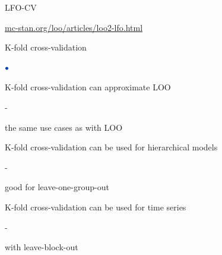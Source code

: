 \documentclass[english,t]{beamer}
\newenvironment{list1}{
   \begin{list}{$\color{list1}\bullet$}{\itemsep=6pt}}{
  \end{list}}
\newenvironment{list2}{
  \begin{list}{-}{\baselineskip=12pt\itemsep=2pt}}{
  \end{list}}
\begin{document}
\begin{frame}{LFO-CV}


  \vspace{2\baselineskip}
   {\small \url{mc-stan.org/loo/articles/loo2-lfo.html}}

  
\end{frame}

\begin{frame}{K-fold cross-validation}

\begin{list1}
\item K-fold cross-validation can approximate LOO
  \begin{list2}
    \item the same use cases as with LOO
  \end{list2}
\item K-fold cross-validation can be used for hierarchical models
  \begin{list2}
    \item good for leave-one-group-out
  \end{list2}
\item K-fold cross-validation can be used for time series
  \begin{list2}
    \item with leave-block-out
  \end{list2}
\end{list1}

\end{frame}

\begin{frame}{}

  
\end{frame}
\end{document}
